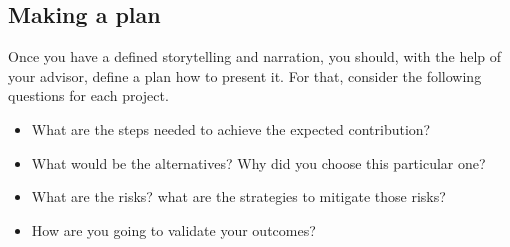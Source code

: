 \subsection{Making a plan}

Once you have a defined storytelling and narration,  you should, with the help of your advisor, define a plan how to present it. For that, consider the following questions for each project. 

\begin{itemize}
    \item  What are the steps needed to achieve the expected contribution?
    \item  What would be the alternatives? Why did you choose this particular one?
    \item  What are the risks? what are the strategies to mitigate those risks?
    \item  How are you going to validate your outcomes?
\end{itemize}


